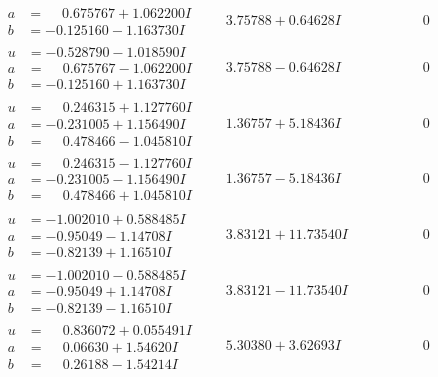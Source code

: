 \documentclass[1p]{elsarticle_modified}
\theoremstyle{definition}
\begin{document}
$$\begin{array}{c|c|c}
\begin{aligned}
a &= \phantom{-}0.675767 + 1.062200 I \\
b &= -0.125160 - 1.163730 I\end{aligned}
 & \phantom{-}3.75788 + 0.64628 I & \phantom{-0.000000 } 0 \\ \hline\begin{aligned}
u &= -0.528790 - 1.018590 I \\
a &= \phantom{-}0.675767 - 1.062200 I \\
b &= -0.125160 + 1.163730 I\end{aligned}
 & \phantom{-}3.75788 - 0.64628 I & \phantom{-0.000000 } 0 \\ \hline\begin{aligned}
u &= \phantom{-}0.246315 + 1.127760 I \\
a &= -0.231005 + 1.156490 I \\
b &= \phantom{-}0.478466 - 1.045810 I\end{aligned}
 & \phantom{-}1.36757 + 5.18436 I & \phantom{-0.000000 } 0 \\ \hline\begin{aligned}
u &= \phantom{-}0.246315 - 1.127760 I \\
a &= -0.231005 - 1.156490 I \\
b &= \phantom{-}0.478466 + 1.045810 I\end{aligned}
 & \phantom{-}1.36757 - 5.18436 I & \phantom{-0.000000 } 0 \\ \hline\begin{aligned}
u &= -1.002010 + 0.588485 I \\
a &= -0.95049 - 1.14708 I \\
b &= -0.82139 + 1.16510 I\end{aligned}
 & \phantom{-}3.83121 + 11.73540 I & \phantom{-0.000000 } 0 \\ \hline\begin{aligned}
u &= -1.002010 - 0.588485 I \\
a &= -0.95049 + 1.14708 I \\
b &= -0.82139 - 1.16510 I\end{aligned}
 & \phantom{-}3.83121 - 11.73540 I & \phantom{-0.000000 } 0 \\ \hline\begin{aligned}
u &= \phantom{-}0.836072 + 0.055491 I \\
a &= \phantom{-}0.06630 + 1.54620 I \\
b &= \phantom{-}0.26188 - 1.54214 I\end{aligned}
 & \phantom{-}5.30380 + 3.62693 I & \phantom{-0.000000 } 0 \\ \hline\begin{aligned}

\end{aligned}
\end{array}$$
\end{document}
